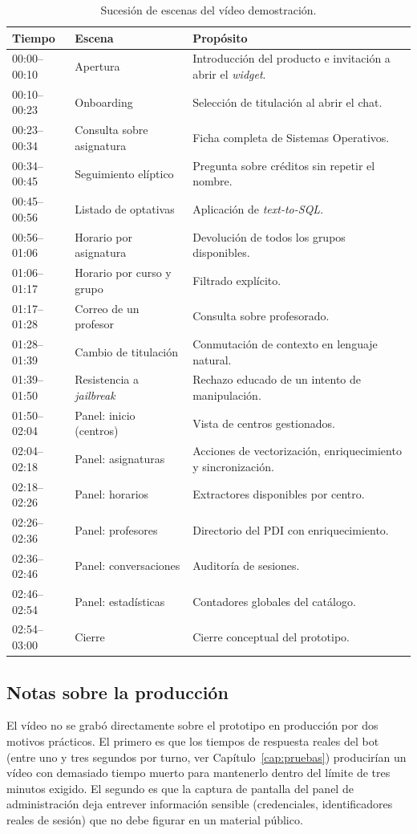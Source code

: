 \begin{table}[hbtp]
\centering
\caption{Sucesión de escenas del vídeo demostración.}\label{tab:video-estructura}
\small
\begin{tabular}{p{1.8cm}p{6cm}p{5.5cm}}
\hline
\textbf{Tiempo} & \textbf{Escena} & \textbf{Propósito} \\
\hline
00:00–00:10 & Apertura & Introducción del producto e invitación a abrir el \textit{widget}. \\
00:10–00:23 & Onboarding & Selección de titulación al abrir el chat. \\
00:23–00:34 & Consulta sobre asignatura & Ficha completa de Sistemas Operativos. \\
00:34–00:45 & Seguimiento elíptico & Pregunta sobre créditos sin repetir el nombre. \\
00:45–00:56 & Listado de optativas & Aplicación de \textit{text-to-SQL}. \\
00:56–01:06 & Horario por asignatura & Devolución de todos los grupos disponibles. \\
01:06–01:17 & Horario por curso y grupo & Filtrado explícito. \\
01:17–01:28 & Correo de un profesor & Consulta sobre profesorado. \\
01:28–01:39 & Cambio de titulación & Conmutación de contexto en lenguaje natural. \\
01:39–01:50 & Resistencia a \textit{jailbreak} & Rechazo educado de un intento de manipulación. \\
01:50–02:04 & Panel: inicio (centros) & Vista de centros gestionados. \\
02:04–02:18 & Panel: asignaturas & Acciones de vectorización, enriquecimiento y sincronización. \\
02:18–02:26 & Panel: horarios & Extractores disponibles por centro. \\
02:26–02:36 & Panel: profesores & Directorio del PDI con enriquecimiento. \\
02:36–02:46 & Panel: conversaciones & Auditoría de sesiones. \\
02:46–02:54 & Panel: estadísticas & Contadores globales del catálogo. \\
02:54–03:00 & Cierre & Cierre conceptual del prototipo. \\
\hline
\end{tabular}
\end{table}

\subsection{Notas sobre la producción}\label{subsec:video-produccion}

El vídeo no se grabó directamente sobre el prototipo en producción por dos motivos prácticos. El primero es que los tiempos de respuesta reales del bot (entre uno y tres segundos por turno, ver Capítulo~\ref{cap:pruebas}) producirían un vídeo con demasiado tiempo muerto para mantenerlo dentro del límite de tres minutos exigido. El segundo es que la captura de pantalla del panel de administración deja entrever información sensible (credenciales, identificadores reales de sesión) que no debe figurar en un material público.

